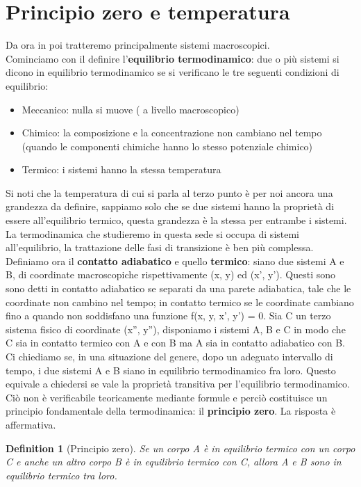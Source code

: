 \documentclass[10pt,a4paper]{article}
\newtheorem{definition}{Definition}
\begin{document}
\section{Principio zero e temperatura}
Da ora in poi tratteremo principalmente sistemi macroscopici.\\
Cominciamo con il definire l'\textbf{equilibrio termodinamico}: due o più sistemi si dicono in equilibrio termodinamico se si verificano le tre seguenti condizioni di equilibrio:
\begin{itemize}
	\item Meccanico: nulla si muove ( a livello macroscopico)
	\item Chimico: la composizione e la concentrazione non cambiano nel tempo (quando le componenti chimiche hanno lo stesso potenziale chimico)
	\item Termico: i sistemi hanno la stessa temperatura
\end{itemize}	
Si noti che la temperatura di cui si parla al terzo punto è per noi ancora una grandezza da definire, sappiamo solo che se due sistemi hanno la proprietà di essere all'equilibrio termico, questa grandezza è la stessa per entrambe i sistemi. La termodinamica che studieremo in questa sede si occupa di sistemi all'equilibrio, la trattazione delle fasi di transizione è ben più complessa.\\
Definiamo ora il \textbf{contatto adiabatico} e quello \textbf{termico}:
siano due sistemi A e B, di coordinate macroscopiche rispettivamente (x, y) ed (x', y'). Questi sono sono detti in contatto adiabatico se separati da una parete adiabatica, tale che le coordinate non cambino nel tempo; in contatto termico se le coordinate cambiano fino a quando non soddisfano una funzione f(x, y, x', y') = 0. Sia C un terzo sistema fisico di coordinate (x'', y''), disponiamo i sistemi A, B e C in modo che C sia in contatto termico con A e con B ma A sia in contatto adiabatico con B. Ci chiediamo se, in una situazione del genere, dopo un adeguato intervallo di tempo, i due sistemi A e B siano in equilibrio termodinamico fra loro. Questo equivale a chiedersi se vale la proprietà transitiva per l'equilibrio termodinamico. Ciò non è verificabile teoricamente mediante formule e perciò costituisce un principio fondamentale della termodinamica: il \textbf{principio zero}. La risposta è affermativa.
\begin{definition}[Principio zero]
Se un corpo A è in equilibrio termico con un corpo C e anche un altro corpo B è in equilibrio termico con C, allora A e B sono in equilibrio termico tra loro.
\end{definition}
\end{document}
